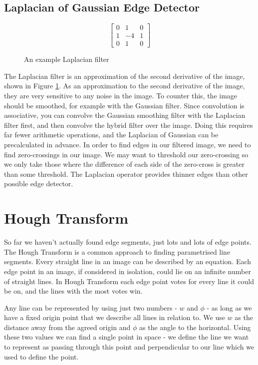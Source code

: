 \documentclass{article}
\begin{document}
	\subsection{Laplacian of Gaussian Edge Detector}
	\begin{figure}[ht]
			\begingroup
			\renewcommand*{\arraystretch}{1.7}	
			\centering
			\[ \begin{bmatrix} 0 & 1 & 0 \\
								1 & -4 & 1 \\
								0 & 1 & 0
			\end{bmatrix} \]
			\endgroup
			\caption{An example Laplacian filter}
			\label{fig:laplacian filter}
	\end{figure}
	The Laplacian filter is an approximation of the second derivative of the image, shown in Figure  \ref{fig:laplacian filter}. As an approximation to the second derivative of the image, they are very sensitive to any noise in the image. To counter this, the image should be smoothed, for example with the Gaussian filter. Since convolution is associative, you can convolve the Gaussian smoothing filter with the Laplacian filter first, and then convolve the hybrid filter over the image. Doing this requires far fewer arithmetic operations, and the Laplacian of Gaussian can be precalculated in advance. In order to find edges in our filtered image, we need to find zero-crossings in our image. We may want to threshold our zero-crossing so we only take those where the difference of each side of the zero-cross is greater than some threshold. The Laplacian operator provides thinner edges than other possible edge detector.
	
	\section{Hough Transform}
	So far we haven't actually found edge segments, just lots and lots of edge points. The Hough Transform is a common approach to finding parametrised line segments. Every straight line in an image can be described by an equation. Each edge point in an image, if considered in isolation, could lie on an infinite number of straight lines. In Hough Transform each edge point votes for every line it could be on, and the lines with the most votes win.
	
	\par
	Any line can be represented by using just two numbers - $w$ and $\phi$ - as long as we have a fixed origin point that we describe all lines in relation to. We use $w$ as the distance away from the agreed origin and $\phi$ as the angle to the horizontal. Using these two values we can find a single point in space - we define the line we want to represent as passing through this point and perpendicular to our line which we used to define the point. 
	
\end{document}
